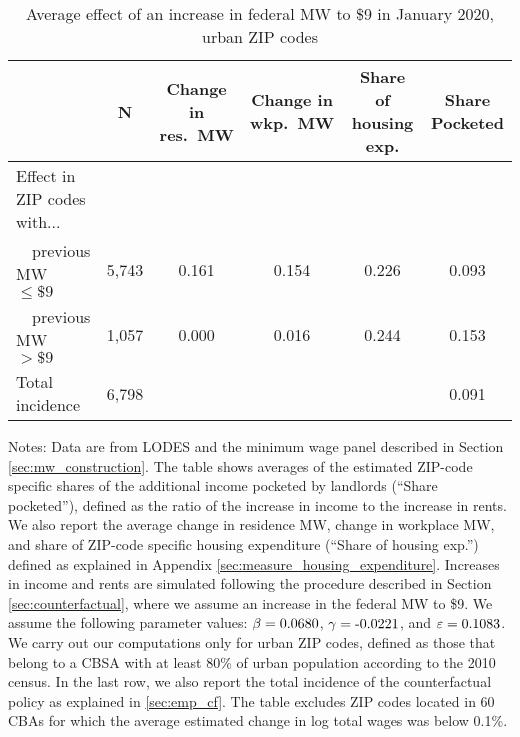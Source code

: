 \begin{table}[hbt!]
    \centering
    \caption{Average effect of an increase in federal MW to \$9 in January 2020, urban ZIP codes}
    \label{tab:counterfactuals_fed_9usd}

    \begin{tabular}{@{}lccccc@{}}
        \toprule
                         & N & \shortstack{Change in\\res.\ MW}
                             & \shortstack{Change in\\wkp.\ MW}
                             & \shortstack{Share of\\housing exp.}  
                             & \shortstack{Share\\Pocketed}                      \\ \midrule
        Effect in ZIP codes with...          &      &       &       &     &      \\
        $\quad$previous MW $\leq\$9\quad$    & 5,743 &  0.161 & 0.154  & 0.226 &  0.093   \\
        $\quad$previous MW $>\$9\quad$       & 1,057 &  0.000 & 0.016  & 0.244 & 0.153    \\ 
        Total incidence                      & 6,798 &      &      &     & 0.091    \\ \bottomrule
    \end{tabular}
    
    \begin{minipage}{.95\textwidth} \footnotesize
        \vspace{2mm}
        Notes: 
        Data are from LODES and the minimum wage panel described in Section 
        \ref{sec:mw_construction}.
        The table shows averages of the estimated ZIP-code specific shares of the 
        additional income pocketed by landlords (``Share pocketed''), 
        defined as the ratio of the increase in income to the increase in rents. 
        We also report the average change in residence MW, change in workplace MW,
        and share of ZIP-code specific housing expenditure 
        (``Share of housing exp.'') defined as explained in Appendix \ref{sec:measure_housing_expenditure}.
        Increases in income and rents are simulated following the procedure 
        described in Section \ref{sec:counterfactual},
        where we assume an increase in the federal MW to \$9.
        We assume the following parameter values: 
        $\beta = \textnormal{0.0680}$, $\gamma = \textnormal{-0.0221}$, 
        and $\varepsilon = \textnormal{0.1083}$.
        We carry out our computations only for urban ZIP codes, defined as 
        those that belong to a CBSA with at least 80\% of urban population
        according to the 2010 census.
        In the last row, we also report the total incidence of the counterfactual policy
        as explained in \ref{sec:emp_cf}.
        The table excludes ZIP codes located in 60 CBAs for which the average
        estimated change in log total wages was below 0.1\%.
    \end{minipage}
\end{table}


